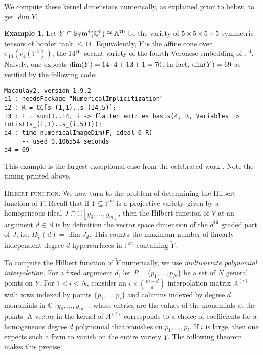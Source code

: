 \documentclass[letter]{amsart}
\theoremstyle{definition}
\newtheorem{example}[prop]{Example}
\begin{document}
\noindent We compute these kernel dimensions numerically, as explained prior to  below, to get $\dim Y$.

\begin{example}
Let $Y \subseteq \textup{Sym}^{4}({\mathbb{C}}^{5}) \cong {\mathbb{A}}^{70}$ be the variety of $5 \times 5 \times 5 \times 5$ symmetric tensors of border rank $\leq 14$. Equivalently, $Y$ is the affine cone over $\sigma_{14}(\nu_{4}({\mathbb{P}}^{4}))$, the $14^{\textup{th}}$ secant variety of the fourth Veronese embedding of ${\mathbb{P}}^{4}$.  Naively, one expects $\textup{dim}(Y) = 14 \cdot 4 + 13 + 1 = 70$.  In fact, $\textup{dim}(Y) = 69$ as verified by the following code:

\vspace{0.05cm}

\begin{verbatim}
Macaulay2, version 1.9.2
i1 : needsPackage "NumericalImplicitization"
i2 : R = CC[s_(1,1)..s_(14,5)];
i3 : F = sum(1..14, i -> flatten entries basis(4, R, Variables => toList(s_(i,1)..s_(i,5))));
i4 : time numericalImageDim(F, ideal 0_R)
     -- used 0.106554 seconds
o4 = 69
\end{verbatim}

\noindent This example is the largest exceptional case from the celebrated work \cite{AH}.  Note the timing printed above.
\end{example}

\vspace{0.2cm}

\noindent
\textsc{Hilbert function.} We now turn to the problem of determining the Hilbert function of $\widetilde{Y}$. Recall that if $\widetilde{Y} \subseteq {\mathbb{P}}^{m}$ is a projective variety, given by a homogeneous ideal $J \subseteq {\mathbb{C}}[y_{0}, \ldots, y_{m}]$, then the Hilbert function of $\widetilde{Y}$ at an argument $d \in {\mathbb{N}}$ is by definition the vector space dimension of the $d^\text{th}$ graded part of $J$, i.e. $H_{\widetilde{Y}}(d)=\dim J_d$. This counts the maximum number of linearly independent degree $d$ hypersurfaces in ${\mathbb{P}}^{m}$ containing $\widetilde{Y}$. 

To compute the Hilbert function of $\widetilde{Y}$ numerically, we use \textit{multivariate polynomial interpolation}. For a fixed argument $d$, let $P = \{p_1, \ldots, p_N\}$ be a set of $N$ general points on $\widetilde{Y}$.  For $1 \le i \le N$, consider an $i \times \binom{m+d}{d}$ interpolation matrix $A^{(i)}$ with rows indexed by points $\{p_1, \ldots, p_i\}$ and columns indexed by degree $d$ monomials in ${\mathbb{C}}[y_{0}, \ldots, y_{m}]$, whose entries are the values of the monomials at the points. A vector in the kernel of $A^{(i)}$ corresponds to a choice of coefficients for a homogeneous degree $d$ polynomial that vanishes on $p_1, \ldots, p_i$. If $i$ is large, then one expects such a form to vanish on the entire variety $\widetilde{Y}$. The following theorem makes this precise:
\end{document}
